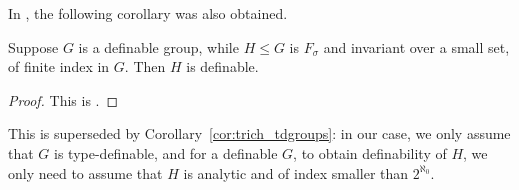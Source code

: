 	In \cite{KM14}, the following corollary was also obtained.
	\begin{fct}
		\label{fct:KM_about_groups}
		Suppose $G$ is a definable group, while $H\leq G$ is $F_\sigma$ and invariant over a small set, of finite index in $G$. Then $H$ is definable.
	\end{fct}
	\begin{proof}
		This is \cite[Corollary 3.38]{KM14}.
	\end{proof}
	This is superseded by Corollary~\ref{cor:trich_tdgroups}: in our case, we only assume that $G$ is type-definable, and for a definable $G$, to obtain definability of $H$, we only need to assume that $H$ is analytic and of index smaller than $2^{\aleph_0}$.
	
	

